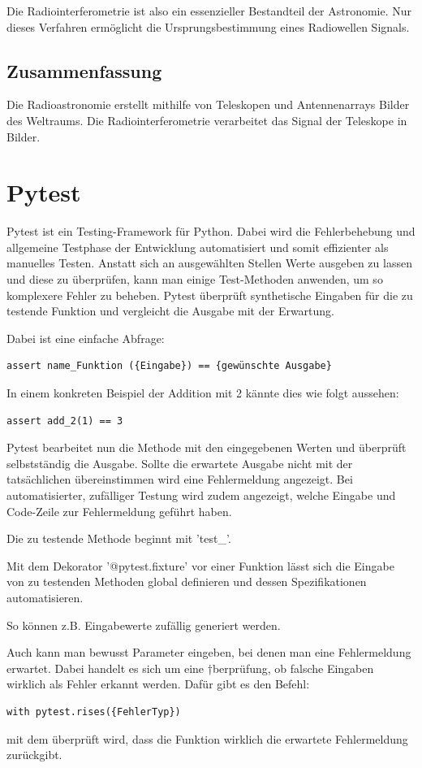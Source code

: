 \documentclass[]{dsadokumentation}
\begin{document}
Die Radiointerferometrie ist also ein essenzieller Bestandteil der Astronomie. Nur dieses Verfahren ermöglicht die Ursprungsbestimmung eines Radiowellen Signals.

\subsection{Zusammenfassung}
Die Radioastronomie erstellt mithilfe von Teleskopen und Antennenarrays Bilder des Weltraums. Die Radiointerferometrie verarbeitet das Signal der Teleskope in Bilder.

\section{Pytest}
Pytest ist ein Testing-Framework für Python. Dabei wird die Fehlerbehebung und allgemeine Testphase der Entwicklung automatisiert und somit effizienter als manuelles Testen. Anstatt sich an ausgewählten Stellen Werte ausgeben zu lassen und diese zu überprüfen, kann man einige Test-Methoden anwenden, um so komplexere Fehler zu beheben. Pytest überprüft synthetische Eingaben für die zu testende Funktion und vergleicht die Ausgabe mit der Erwartung.

Dabei ist eine einfache Abfrage:

\begin{verbatim}
assert name_Funktion ({Eingabe}) == {gewünschte Ausgabe} 
\end{verbatim}
In einem konkreten Beispiel der Addition mit 2 kännte dies wie folgt aussehen: 
\begin{verbatim}
assert add_2(1) == 3 
\end{verbatim}
 Pytest bearbeitet nun die Methode mit den eingegebenen Werten und überprüft selbstständig die Ausgabe. Sollte die erwartete Ausgabe nicht mit der tatsächlichen übereinstimmen wird eine Fehlermeldung angezeigt. Bei automatisierter, zufälliger Testung wird zudem angezeigt, welche Eingabe und Code-Zeile zur Fehlermeldung geführt haben.

Die zu testende Methode beginnt mit 'test\_'.

 Mit dem Dekorator '@pytest.fixture' vor einer Funktion lässt sich die Eingabe von zu testenden Methoden global definieren und dessen Spezifikationen automatisieren.  

So können z.B. Eingabewerte zufällig generiert werden. 

Auch kann man bewusst Parameter eingeben, bei denen man eine Fehlermeldung erwartet. Dabei handelt es sich um eine †berprüfung, ob falsche Eingaben wirklich als Fehler erkannt werden. Dafür gibt es den Befehl: 
\begin{verbatim}
with pytest.rises({FehlerTyp}) 
\end{verbatim}
 mit dem überprüft wird, dass die Funktion wirklich die erwartete Fehlermeldung zurückgibt.
 
\end{document}

